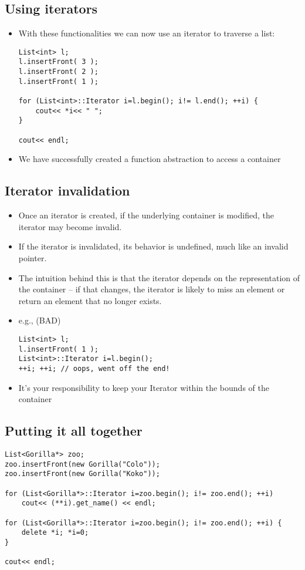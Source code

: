 \subsection{Using iterators}
\begin{itemize}
	\item With these functionalities we can now use an iterator to traverse a list:
\begin{lstlisting}[style=C++]
List<int> l;
l.insertFront( 3 );
l.insertFront( 2 );
l.insertFront( 1 );

for (List<int>::Iterator i=l.begin(); i!= l.end(); ++i) {
	cout<< *i<< " ";
}

cout<< endl;
\end{lstlisting}
	\item We have successfully created a function abstraction to access a container
\end{itemize}

\subsection{Iterator invalidation}
\begin{itemize}
	\item Once an iterator is created, if the underlying container is modified, the iterator may become invalid.
	\item If the iterator is invalidated, its behavior is undefined, much like an invalid pointer.
	\item The intuition behind this is that the iterator depends on the representation of the container – if that changes, the iterator is likely to miss an element or return an element that no longer exists.
	\item e.g., (BAD)
\begin{lstlisting}[style=C++]
List<int> l;
l.insertFront( 1 );
List<int>::Iterator i=l.begin();
++i; ++i; // oops, went off the end!
\end{lstlisting}
	\item It’s your responsibility to keep your Iterator within the bounds of the container
\end{itemize}

\subsection{Putting it all together}
\begin{lstlisting}[style=C++]
List<Gorilla*> zoo;
zoo.insertFront(new Gorilla("Colo"));
zoo.insertFront(new Gorilla("Koko"));

for (List<Gorilla*>::Iterator i=zoo.begin(); i!= zoo.end(); ++i)
	cout<< (**i).get_name() << endl;

for (List<Gorilla*>::Iterator i=zoo.begin(); i!= zoo.end(); ++i) {
	delete *i; *i=0;
}

cout<< endl;
\end{lstlisting}